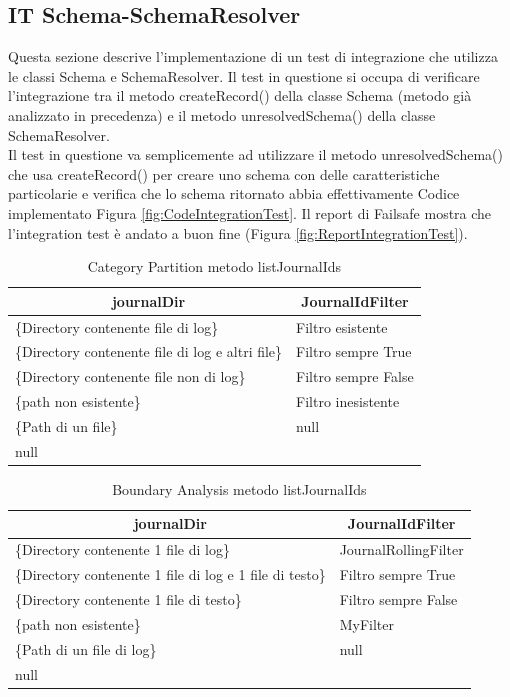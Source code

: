 \documentclass[12pt, a4paper]{article}
\begin{document}
\subsection{IT Schema-SchemaResolver}
Questa sezione descrive l'implementazione di un test di integrazione che utilizza le classi Schema e SchemaResolver.
Il test in questione si occupa di verificare l'integrazione tra il metodo createRecord() della classe Schema (metodo già
analizzato in precedenza) e il metodo unresolvedSchema() della classe SchemaResolver. \\
Il test in questione va semplicemente ad utilizzare il metodo unresolvedSchema() che usa createRecord() per creare uno schema
con delle caratteristiche particolarie e verifica che lo schema ritornato abbia effettivamente
Codice implementato Figura \ref{fig:CodeIntegrationTest}.
Il report di Failsafe mostra che l'integration test è andato a buon fine (Figura \ref{fig:ReportIntegrationTest}).
\newpage

\begin{table}[ht]
  \centering
  \caption[Journal: Category Partition]{Category Partition metodo listJournalIds}
  \begin{tabular}{|l|l|}
  \hline
  \multicolumn{1}{|c|}{journalDir} & \multicolumn{1}{|c|}{JournalIdFilter} \\
  \hline
  \{Directory contenente file di log\} & Filtro esistente \\
  \{Directory contenente file di log e altri file\} & Filtro sempre True \\
  \{Directory contenente file non di log\} & Filtro sempre False \\
  \{path non esistente\} & Filtro inesistente \\
  \{Path di un file\} & null \\
  null & \\
  \hline
  \end{tabular}
  \label{tab:categoryPartitionListJournalIds}
\end{table}

\begin{table}[ht]
  \centering
  \caption[Journal: Boundary Analysis]{Boundary Analysis metodo listJournalIds}
  \begin{tabular}{|l|l|}
  \hline
  \multicolumn{1}{|c|}{journalDir} & \multicolumn{1}{|c|}{JournalIdFilter} \\
  \hline
  \{Directory contenente 1 file di log\} & JournalRollingFilter \\
  \{Directory contenente 1 file di log e 1 file di testo\} & Filtro sempre True \\
  \{Directory contenente 1 file di testo\} & Filtro sempre False \\
  \{path non esistente\} & MyFilter \\
  \{Path di un file di log\} & null \\
  null & \\
  \hline
  \end{tabular}
  \label{tab:boundaryAnalyisListJournalIds}
\end{table}
\end{document}
